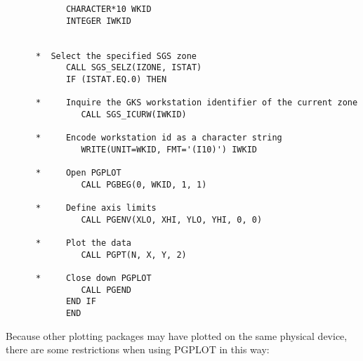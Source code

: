 \begin{small}
\begin{verbatim}
            CHARACTER*10 WKID                                                
            INTEGER IWKID                                                    
                                                                             
                                                                             
      *  Select the specified SGS zone                                       
            CALL SGS_SELZ(IZONE, ISTAT)                                      
            IF (ISTAT.EQ.0) THEN                                             
                                                                             
      *     Inquire the GKS workstation identifier of the current zone       
               CALL SGS_ICURW(IWKID)                                         
                                                                             
      *     Encode workstation id as a character string                      
               WRITE(UNIT=WKID, FMT='(I10)') IWKID                           
                                                                             
      *     Open PGPLOT                                                      
               CALL PGBEG(0, WKID, 1, 1)                                     
                                                                             
      *     Define axis limits                                               
               CALL PGENV(XLO, XHI, YLO, YHI, 0, 0)                          
                                                                             
      *     Plot the data                                                    
               CALL PGPT(N, X, Y, 2)                                         
                                                                             
      *     Close down PGPLOT                                                
               CALL PGEND                                                    
            END IF                                                           
            END                                                              
\end{verbatim}                                                         
\end{small}

Because other plotting packages may have plotted on the same physical device,
there are some restrictions when using PGPLOT in this way:

